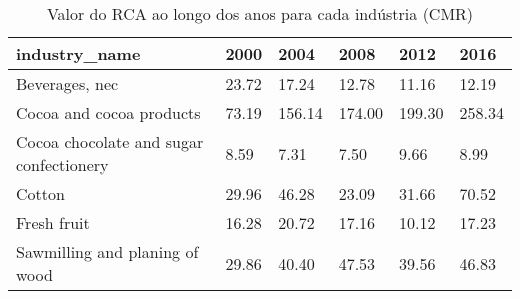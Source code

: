 \begin{table}
\centering
\caption{Valor do RCA ao longo dos anos para cada indústria (CMR)}
\begin{tabular}{p{6cm}p{1.5cm}p{1.5cm}p{1.5cm}p{1.5cm}p{1.5cm}}
\toprule
                          industry\_name &  2000 &   2004 &   2008 &   2012 &   2016 \\
\midrule
                         Beverages, nec & 23.72 &  17.24 &  12.78 &  11.16 &  12.19 \\
               Cocoa and cocoa products & 73.19 & 156.14 & 174.00 & 199.30 & 258.34 \\
Cocoa chocolate and sugar confectionery &  8.59 &   7.31 &   7.50 &   9.66 &   8.99 \\
                                 Cotton & 29.96 &  46.28 &  23.09 &  31.66 &  70.52 \\
                            Fresh fruit & 16.28 &  20.72 &  17.16 &  10.12 &  17.23 \\
         Sawmilling and planing of wood & 29.86 &  40.40 &  47.53 &  39.56 &  46.83 \\
\bottomrule
\end{tabular}
\end{table}

